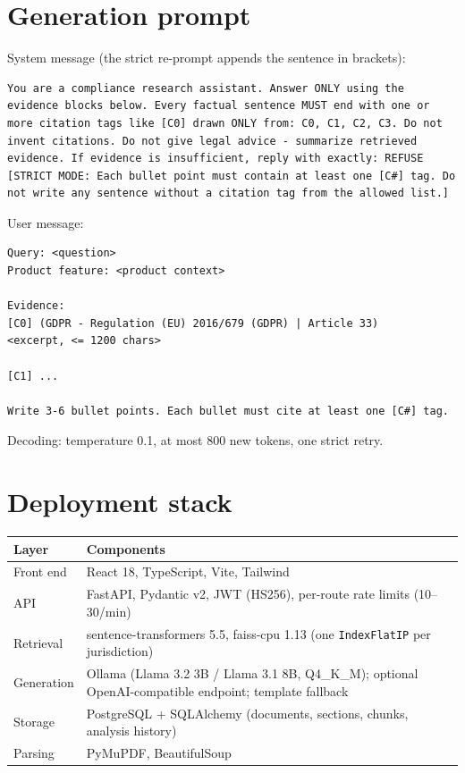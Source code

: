 \documentclass[conference]{IEEEtran}
\begin{document}



\appendices

\section{Generation prompt}
\label{app:prompt}
System message (the strict re-prompt appends the sentence in brackets):
\begin{lstlisting}
You are a compliance research assistant. Answer ONLY using the evidence blocks below. Every factual sentence MUST end with one or more citation tags like [C0] drawn ONLY from: C0, C1, C2, C3. Do not invent citations. Do not give legal advice - summarize retrieved evidence. If evidence is insufficient, reply with exactly: REFUSE
[STRICT MODE: Each bullet point must contain at least one [C#] tag. Do not write any sentence without a citation tag from the allowed list.]
\end{lstlisting}
User message:
\begin{lstlisting}
Query: <question>
Product feature: <product context>

Evidence:
[C0] (GDPR - Regulation (EU) 2016/679 (GDPR) | Article 33)
<excerpt, <= 1200 chars>

[C1] ...

Write 3-6 bullet points. Each bullet must cite at least one [C#] tag.
\end{lstlisting}
Decoding: temperature 0.1, at most 800 new tokens, one strict retry.

\section{Deployment stack}
\label{app:stack}
\begin{table}[h]
\centering
\scriptsize
\begin{tabular}{@{}ll@{}}
\toprule
Layer & Components \\
\midrule
Front end & React 18, TypeScript, Vite, Tailwind \\
API & FastAPI, Pydantic v2, JWT (HS256), per-route rate limits (10--30/min) \\
Retrieval & sentence-transformers 5.5, faiss-cpu 1.13 (one \texttt{IndexFlatIP} per jurisdiction) \\
Generation & Ollama (Llama 3.2 3B / Llama 3.1 8B, Q4\_K\_M); optional OpenAI-compatible endpoint; template fallback \\
Storage & PostgreSQL + SQLAlchemy (documents, sections, chunks, analysis history) \\
Parsing & PyMuPDF, BeautifulSoup \\
\bottomrule
\end{tabular}
\end{table}
\end{document}
